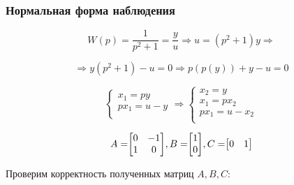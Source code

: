 \documentclass[14pt,a4paper,report]{report}
\begin{document}
\subsubsection{Нормальная форма наблюдения}

\begin{equation*}
\text{$W(p)=\frac{1}{p^2 + 1}=\frac{y}{u}$}
\Longrightarrow
\text{$u=(p^2 + 1)y$}
\Longrightarrow
\end{equation*}

\begin{equation*}
\Longrightarrow
\text{$y(p^2 +1)- u=0$}
\Longrightarrow
\text{$p(p(y)) + y - u =0$}
\end{equation*}

\begin{equation*}
\begin{cases}
	\text{$x_1=py$} \\
	\text{$px_1= u - y$} \\
\end{cases}
\Longrightarrow
\begin{cases}
	\text{$x_2=y$}\\
	\text{$x_1=px_2$} \\
	\text{$px_1=u - x_2$} \\
\end{cases}
\end{equation*}

\begin{equation*}
\text{$A=$}
\text{$
	\begin{bmatrix}
	0 & -1 \\
	1 & 0 \\
	\end{bmatrix}
	$}
\text{$, B=$}
\text{$
	\begin{bmatrix}
	1 \\
	0 \\
	\end{bmatrix}
	$}
\text{$, C=$}
\text{$
	\begin{bmatrix}
	0 & 1 \\
	\end{bmatrix}
	$}
\end{equation*}

Проверим корректность полученных матриц $A, B, C$:
\end{document}
